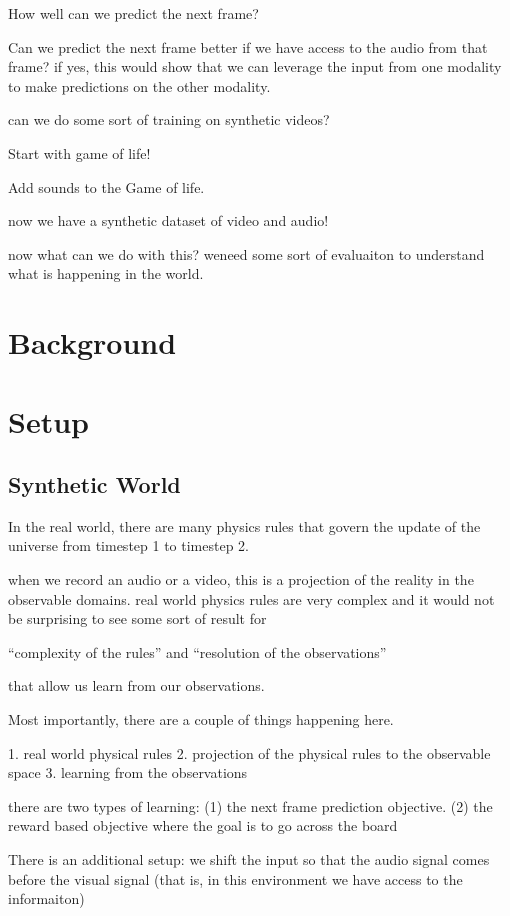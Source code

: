 How well can we predict the next frame?


Can we predict the next frame better if we have access to the audio from that frame? if yes, this would show that we can leverage the input from one modality to make predictions on the other modality. 

can we do some sort of training on synthetic videos?

Start with game of life!

Add sounds to the Game of life. 

now we have a synthetic dataset of video and audio!

now what can we do with this? weneed some sort of evaluaiton to understand what is happening in the world. 

\section{Background}
\section{Setup}
\subsection{Synthetic World}
In the real world, there are many physics rules that govern the update of the universe from timestep 1 to timestep 2. 

when we record an audio or a video, this is a projection of the reality in the observable domains. real world physics rules are very complex and it would not be surprising to see some sort of result for 

``complexity of the rules''
and
``resolution of the observations''

that allow us learn from our observations. 

Most importantly, there are a couple of things happening here. 

1. real world physical rules
2. projection of the physical rules to the observable space
3. learning from the observations


there are two types of learning: 
(1) the next frame prediction objective. 
(2) the reward based objective where the goal is to go across the board


There is an additional setup: we shift the input so that the audio signal comes before the visual signal (that is, in this environment we have access to the informaiton)


